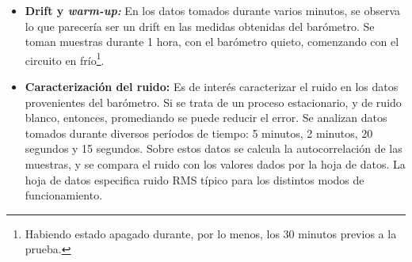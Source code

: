 \documentclass[main]{subfiles}
\begin{document}
\begin{itemize}
\item \label{sec:drift-y-warm-up} \textbf{Drift y \textit{warm-up:}} En los datos tomados durante varios minutos, se observa lo que parecería ser un drift en las medidas obtenidas del barómetro. Se toman muestras durante 1 hora, con el barómetro quieto, comenzando con el circuito en frío\footnote{Habiendo estado apagado durante, por lo menos, los 30 minutos previos a la prueba.}.

\item \textbf{Caracterización del ruido:} Es de interés caracterizar el ruido en los datos provenientes del barómetro. Si se trata de un proceso estacionario, y de ruido blanco, entonces, promediando se puede reducir el error. Se analizan datos tomados durante diversos períodos de tiempo: 5 minutos, 2 minutos, 20 segundos y 15 segundos. Sobre estos datos se calcula la autocorrelación de las muestras, y se compara el ruido con los valores dados por la hoja de datos. La hoja de datos especifica ruido RMS típico para los distintos modos de funcionamiento.

  \begin{figure}[h!]
    \vspace{-20pt}
    \begin{center}
    \end{center}
    \vspace{-20pt}
    \caption{}
    \vspace{-20pt}
    \label{fig:escalera-fing}
  \end{figure}


\end{itemize}
\end{document}
